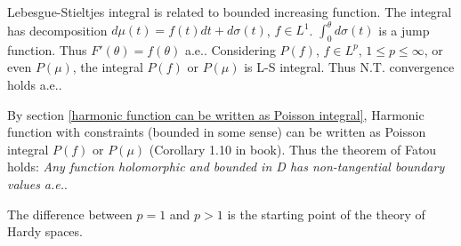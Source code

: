Lebesgue-Stieltjes integral is related to bounded increasing function. The integral has decomposition $d\mu(t)=f(t)dt+d\sigma(t)$, $f\in L^1$.
$\int_0^\theta{d\sigma(t)}$ is a jump function. Thus $F'(\theta)=f(\theta)$ a.e.. Considering $P(f)$, $f\in L^p$, $1\leq p\leq\infty$, or even $P(\mu)$, the integral $P(f)$ or $P(\mu)$ is L-S integral. Thus N.T. convergence holds a.e..\par
By section \ref{harmonic function can be written as Poisson integral}, Harmonic function with constraints (bounded in some sense) can be written as Poisson integral $P(f)$ or $P(\mu)$ (Corollary 1.10 in book). Thus the theorem of Fatou
holds: \emph{Any function holomorphic and bounded in D has non-tangential boundary values a.e.}. \par
The difference between $p=1$ and $p>1$ is the starting point of the theory of Hardy spaces.
